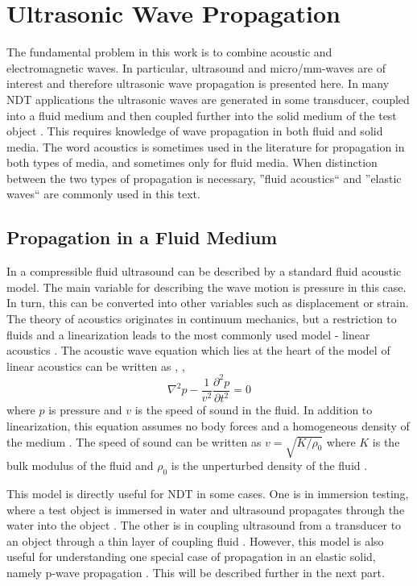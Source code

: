 \documentclass[11pt,twoside]{eitExjobb}
\begin{document}
	\section{Ultrasonic Wave Propagation}
	The fundamental problem in this work is to combine acoustic and electromagnetic waves. In particular, ultrasound and micro/mm-waves are of interest and therefore ultrasonic wave propagation is presented here. In many NDT applications the ultrasonic waves are generated in some transducer, coupled into a fluid medium and then coupled further into the solid medium of the test object \cite{Schmerr2016}. This requires knowledge of wave propagation in both fluid and solid media. The word acoustics is sometimes used in the literature for propagation in both types of media, and sometimes only for fluid media. When distinction between the two types of propagation is necessary, ''fluid acoustics`` and ''elastic waves`` are commonly used in this text.
	
	\subsection{Propagation in a Fluid Medium}
	In a compressible fluid ultrasound can be described by a standard fluid acoustic model. The main variable for describing the wave motion is pressure in this case. In turn, this can be converted into other variables such as displacement or strain. The theory of acoustics originates in continuum mechanics, but a restriction to fluids and a linearization leads to the most commonly used model - linear acoustics \cite{Rossing2014}. The acoustic wave equation which lies at the heart of the model of linear acoustics can be written as \cite{Rossing2014}, \cite{Schmerr2016}, \cite{Kaufman2000}
	\begin{equation}
		\nabla^2 p - \frac{1}{v^2} \frac{\partial^2 p}{\partial t^2} = 0
		\label{eq:th-ac-wave}
	\end{equation}
	where $p$ is pressure and $v$ is the speed of sound in the fluid. In addition to linearization, this equation assumes no body forces and a homogeneous density of the medium \cite{Rossing2014}. The speed of sound can be written as $v = \sqrt{K/\rho_0}$ where $K$ is the bulk modulus of the fluid and $\rho_0$ is the unperturbed density of the fluid \cite{Kaufman2000}.
	
	This model is directly useful for NDT in some cases. One is in immersion testing, where a test object is immersed in water and ultrasound propagates through the water into the object \cite{Schmerr2016}. The other is in coupling ultrasound from a transducer to an object through a thin layer of coupling fluid \cite{Schmerr2016}. However, this model is also useful for understanding one special case of propagation in an elastic solid, namely p-wave propagation \cite{Rossing2014}. This will be described further in the next part.
	
\end{document}
